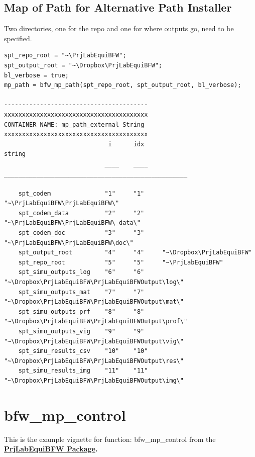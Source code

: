 \documentclass[
]{book}
\begin{document}
\hypertarget{map-of-path-for-alternative-path-installer}{%
\subsection{Map of Path for Alternative Path Installer}\label{map-of-path-for-alternative-path-installer}}

Two directories, one for the repo and one for where outputs go, need to
be specified.

\begin{verbatim}
spt_repo_root = "~\PrjLabEquiBFW";
spt_output_root = "~\Dropbox\PrjLabEquiBFW";
bl_verbose = true;
mp_path = bfw_mp_path(spt_repo_root, spt_output_root, bl_verbose);

----------------------------------------
xxxxxxxxxxxxxxxxxxxxxxxxxxxxxxxxxxxxxxxx
CONTAINER NAME: mp_path_external String
xxxxxxxxxxxxxxxxxxxxxxxxxxxxxxxxxxxxxxxx
                             i      idx                           string                       
                            ____    ____    ___________________________________________________

    spt_codem               "1"     "1"     "~\PrjLabEquiBFW\PrjLabEquiBFW\"                   
    spt_codem_data          "2"     "2"     "~\PrjLabEquiBFW\PrjLabEquiBFW\_data\"             
    spt_codem_doc           "3"     "3"     "~\PrjLabEquiBFW\PrjLabEquiBFW\doc\"               
    spt_output_root         "4"     "4"     "~\Dropbox\PrjLabEquiBFW"                          
    spt_repo_root           "5"     "5"     "~\PrjLabEquiBFW"                                  
    spt_simu_outputs_log    "6"     "6"     "~\Dropbox\PrjLabEquiBFW\PrjLabEquiBFWOutput\log\" 
    spt_simu_outputs_mat    "7"     "7"     "~\Dropbox\PrjLabEquiBFW\PrjLabEquiBFWOutput\mat\" 
    spt_simu_outputs_prf    "8"     "8"     "~\Dropbox\PrjLabEquiBFW\PrjLabEquiBFWOutput\prof\"
    spt_simu_outputs_vig    "9"     "9"     "~\Dropbox\PrjLabEquiBFW\PrjLabEquiBFWOutput\vig\" 
    spt_simu_results_csv    "10"    "10"    "~\Dropbox\PrjLabEquiBFW\PrjLabEquiBFWOutput\res\" 
    spt_simu_results_img    "11"    "11"    "~\Dropbox\PrjLabEquiBFW\PrjLabEquiBFWOutput\img\" 
\end{verbatim}

\hypertarget{bfw_mp_control}{%
\section{bfw\_mp\_control}\label{bfw_mp_control}}

This is the example vignette for function: bfw\_mp\_control from the
\href{https://fanwangecon.github.io/PrjLabEquiBFW/}{\textbf{PrjLabEquiBFW
Package}}\textbf{.}
\end{document}
